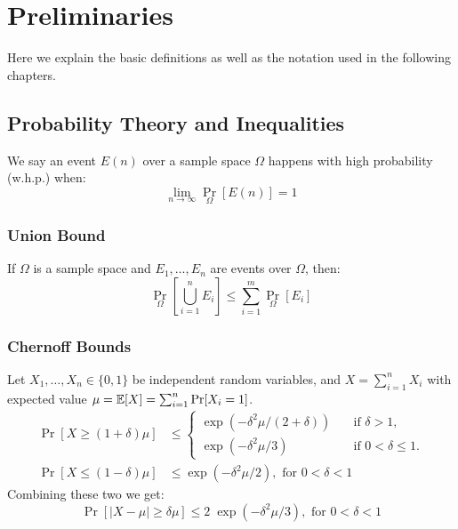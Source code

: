 \chapter{Preliminaries}
\label{ch:prelims}

Here we explain the basic definitions as well as the notation used in the following chapters.

\section{Probability Theory and Inequalities}

We say an event $E(n)$ over a sample space $\Omega$
happens with high probability (w.h.p.) when:
\begin{equation}
    \lim_{n\to\infty}{\Pr_\Omega[E(n)]}=1
\end{equation}

\subsection{Union Bound}

If $\Omega$ is a sample space and $E_1,\ldots,E_n$ are events over $\Omega$, then:
\begin{equation}
    \Pr_\Omega\left[\bigcup_{i=1}^n{E_i}\right]\leq\sum_{i=1}^m{\Pr_\Omega\left[E_i\right]}
\end{equation}

\subsection{Chernoff Bounds}

Let $X_1,\ldots,X_n\in\{0,1\}$ be independent random variables,
and $X=\sum_{i=1}^n{X_i}$ with expected value
$\mu=\mathop{{}\mathbb{E}}[X]=\sum_{i=1}^n{\Pr[X_i=1]}$.
\begin{align}
    \Pr[X\geq(1+\delta)\mu]&\leq
    \begin{cases}
        \exp(-\delta^2\mu/(2+\delta)) & \quad \text{if } \delta>1,\\
        \exp(-\delta^2\mu/3) & \quad \text{if } 0<\delta\leq 1.
    \end{cases}\\
    \label{eq:chernoff-lower-tail}
    \Pr[X\leq(1-\delta)\mu]&\leq \exp(-\delta^2\mu/2),\text{ for }0<\delta<1
\end{align}
Combining these two we get:
\begin{equation}
    \label{eq:chernoff-combined}
    \Pr[|X-\mu|\geq\delta\mu]\leq 2\;\exp(-\delta^2\mu/3),\text{ for }0<\delta<1
\end{equation}

